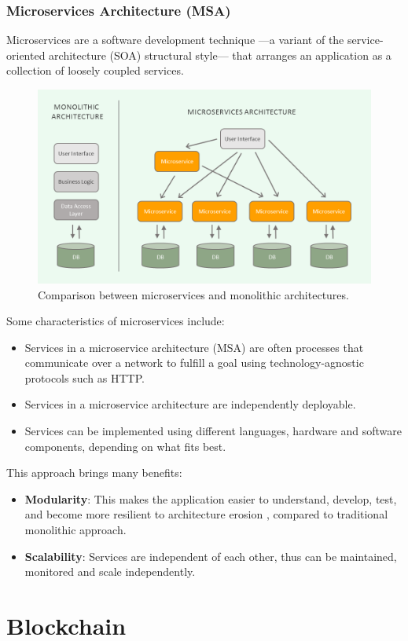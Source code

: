\subsubsection{Microservices Architecture (MSA)}
Microservices are a software development technique —a variant of the service-oriented architecture (SOA) structural style— that arranges an application as a collection of loosely coupled services. \cite{microservices}

\begin{figure}[!h]
	\centering
	\includegraphics[scale=0.3]{Picture/server/microservices.png}
	\caption{Comparison between microservices and monolithic architectures.}
\label{fig:msa}
\end{figure}

Some characteristics of microservices include:
\begin{itemize}
\item Services in a microservice architecture (MSA) are often processes that communicate over a network to fulfill a goal using technology-agnostic protocols such as HTTP. \cite{microservices_newman}
\item Services in a microservice architecture are independently deployable. \cite{microservices_ieee}
\item Services can be implemented using different languages, hardware and software components, depending on what fits best. \cite{microservices_ieee}
\end{itemize}

This approach brings many benefits:
\begin{itemize}
\item \textbf{Modularity}: This makes the application easier to understand, develop, test, and become more resilient to architecture erosion \cite{microservices_ieee}, compared to traditional monolithic approach.
\item \textbf{Scalability}: Services are independent of each other, thus can be maintained, monitored and scale independently.
\end{itemize}

\section{Blockchain}
